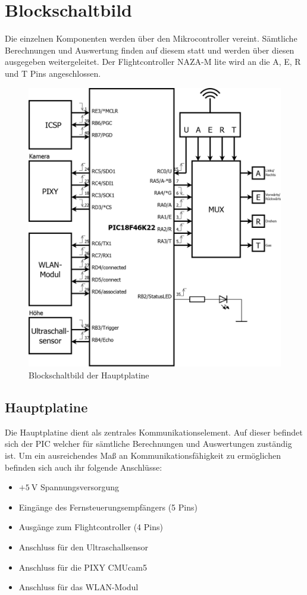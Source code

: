 \section{Blockschaltbild}
Die einzelnen Komponenten werden über den Mikrocontroller vereint. Sämtliche Berechnungen und Auswertung finden auf diesem statt und werden über diesen ausgegeben \bzw
weitergeleitet. Der Flightcontroller NAZA-M lite wird an die A, E, R und T Pins angeschlossen.
\begin{figure}[H]
  \begin{centering}
    \includegraphics[width = 1\textwidth]{Bilder/Blockschaltbild}
  \par\end{centering}
  \caption{Blockschaltbild der Hauptplatine}
  \label{Blockschaltbild}
\end{figure}

  \subsection{Hauptplatine}
  Die Hauptplatine dient als zentrales Kommunikationselement. Auf dieser befindet sich der PIC welcher für sämtliche Berechnungen und Auswertungen zuständig ist.
  Um ein ausreichendes Maß an Kommunikationsfähigkeit zu ermöglichen befinden sich auch ihr folgende Anschlüsse:
  \begin{itemize}
    \item $+\SI{5}{\volt}$ Spannungsversorgung
    \item Eingänge des Fernsteuerungsempfängers (5 Pins)
    \item Ausgänge zum Flightcontroller (4 Pins)
    \item Anschluss für den Ultraschallsensor
    \item Anschluss für die PIXY CMUcam5
    \item Anschluss für das WLAN-Modul
  \end{itemize}

